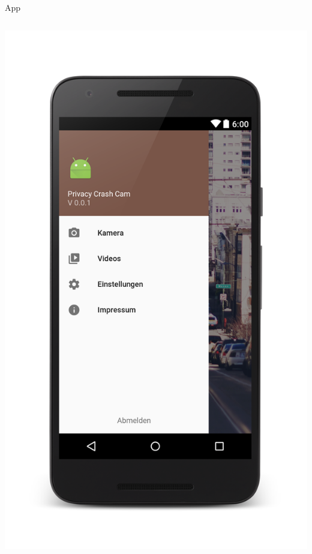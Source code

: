 \documentclass[19pt]{beamer}
\begin{document}
\begin{frame}{App}
\begin{columns}[T]
\begin{column}{.5\textwidth}
    		\includegraphics[scale=0.075]{../subtopicsFuncspec/Res/Mockups/Portrait_camera_view_menu_phone}
    \end{column}
  \end{columns}
\end{frame}
\end{document}
